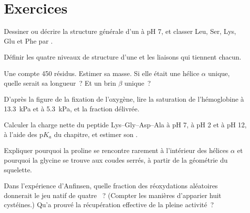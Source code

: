 \section{Exercices}

\begin{exercise}[$\star$]\label{exo:b1:proteins:1}
Dessiner ou décrire la structure générale d'un  à pH 7, et
classer Leu, Ser, Lys, Glu et Phe par .
\end{exercise}

\begin{exercise}[$\star$]\label{exo:b1:proteins:2}
Définir les quatre niveaux de structure d'une  et les liaisons
qui tiennent chacun.
\end{exercise}

\begin{exercise}[$\star$]\label{exo:b1:proteins:3}
Une  compte \qty{450}{} résidus. Estimer sa masse. Si elle était
une hélice $\alpha$ unique, quelle serait sa longueur~? Et un brin
$\beta$ unique~?
\end{exercise}

\begin{exercise}[$\star$]\label{exo:b1:proteins:4}
D'après la figure de la fixation de l'oxygène, lire la saturation de
l'hémoglobine à \qty{13.3}{kPa} et à \qty{5.3}{kPa}, et la fraction
délivrée.
\end{exercise}

\begin{exercise}[$\star\star$]\label{exo:b1:proteins:5}
Calculer la charge nette du peptide Lys--Gly--Asp--Ala à pH 7, à pH 2 et
à pH 12, à l'aide des p$K_a$ du chapitre, et estimer son .
\end{exercise}

\begin{exercise}[$\star\star$]\label{exo:b1:proteins:6}
Expliquer pourquoi la proline se rencontre rarement à l'intérieur des
hélices $\alpha$ et pourquoi la glycine se trouve aux coudes serrés, à
partir de la géométrie du squelette.
\end{exercise}

\begin{exercise}[$\star\star$]\label{exo:b1:proteins:7}
Dans l'expérience d'Anfinsen, quelle fraction des réoxydations
aléatoires donnerait le jeu natif de quatre ~? (Compter
les manières d'apparier huit cystéines.) Qu'a prouvé la récupération
effective de la pleine activité~?
\end{exercise}

